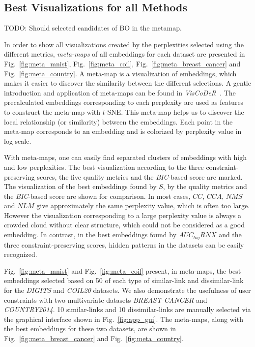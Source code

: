 \subsection{Best Visualizations for all Methods}\label{subsec:result_viz}


TODO: Should selected candidates of BO in the metamap.


In order to show all visualizations created by the perplexities selected using the different metrics, \emph{meta-maps} of all embeddings for each dataset are presented in Fig.~\ref{fig:meta_mnist}, Fig.~\ref{fig:meta_coil}, Fig.~\ref{fig:meta_breast_cancer} and Fig.~\ref{fig:meta_country}.
A meta-map is a visualization of embeddings, which makes it easier to discover the similarity between the different selections.
A gentle introduction and application of meta-maps can be found in \emph{VisCoDeR}~\cite{cutura2018viscoder}.
The precalculated embeddings corresponding to each perplexity are used as features to construct the meta-map with $t$-SNE. This meta-map helps us to discover the local relationship (or similarity) between the embeddings.
Each point in the meta-map corresponds to an embedding and is colorized by perplexity value in log-scale.

With meta-maps, one can easily find separated clusters of embeddings with high and low perplexities.
The best visualization according to the three constraint-preserving scores, the five quality metrics and the \emph{BIC}-based score are marked.
The visualization of the best embeddings found by $S$, by the quality metrics and the \emph{BIC}-based score are shown for comparison.
In most cases, $CC$, $CCA$, $NMS$ and $NLM$ give approximately the same perplexity value, which is often too large. However the visualization corresponding to a large perplexity value is always a crowded cloud without clear structure, which could not be considered as a good embedding. In contrast, in the best embeddings found by $AUC_{log}RNX$ and the three constraint-preserving scores, hidden patterns in the datasets can be easily recognized.

Fig.~\ref{fig:meta_mnist} and Fig.~\ref{fig:meta_coil} present, in meta-maps, the best embeddings selected based on 50 of each type of similar-link and dissimilar-link for the \emph{DIGITS} and \emph{COIL20} datasets.
We also demonstrate the usefulness of user constraints with two multivariate datasets \emph{BREAST-CANCER} and \emph{COUNTRY2014}.
10 similar-links and 10 dissimilar-links are manually selected via the graphical interface shown in Fig.~\ref{fig:app_gui}. The meta-maps, along with the best embeddings for these two datasets, are shown in Fig.~\ref{fig:meta_breast_cancer} and Fig.~\ref{fig:meta_country}.

